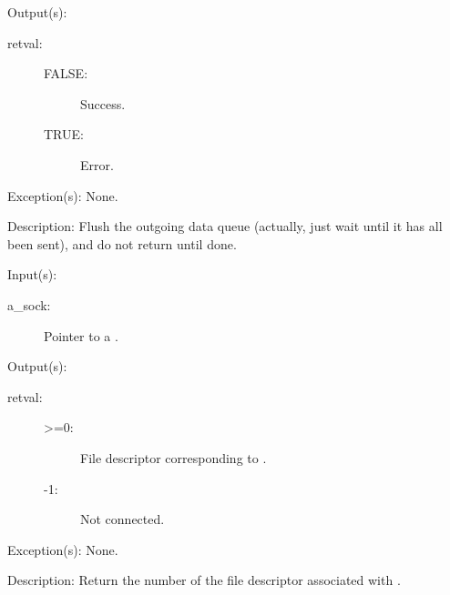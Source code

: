 \begin{capi}
\begin{capilist}
	\item[Output(s): ]
		\begin{description}\item[]
		\item[retval: ]
			\begin{description}\item[]
			\item[FALSE: ] Success.
			\item[TRUE: ] Error.
			\end{description}
		\end{description}
	\item[Exception(s): ] None.
	\item[Description: ]
		Flush the outgoing data queue (actually, just wait until it has
		all been sent), and do not return until done.
	\end{capilist}
\label{sock_fd_get}
	\begin{capilist}
	\item[Input(s): ]
		\begin{description}\item[]
		\item[a\_sock: ]
			Pointer to a .
		\end{description}
	\item[Output(s): ]
		\begin{description}\item[]
		\item[retval: ]
			\begin{description}\item[]
			\item[>=0: ]
				File descriptor corresponding to .
			\item[-1: ]
				Not connected.
			\end{description}
		\end{description}
	\item[Exception(s): ] None.
	\item[Description: ]
		Return the number of the file descriptor associated with
		.
	\end{capilist}
\end{capi}
